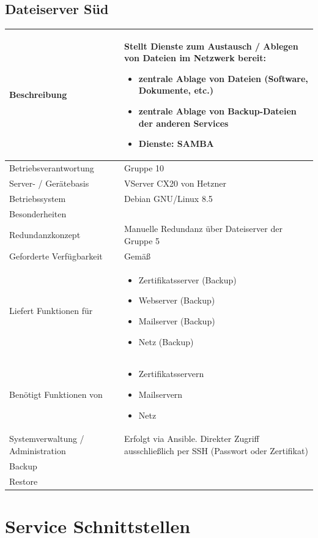 \documentclass[]{article}
\begin{document}
\newpage

\subsection{Dateiserver Süd}\label{dateiserver-suxfcd}

\begin{longtable}{l|p{8cm}}
\toprule
Beschreibung & Stellt Dienste zum Austausch / Ablegen von Dateien im
Netzwerk bereit:

\begin{itemize}
\item
  zentrale Ablage von Dateien (Software, Dokumente, etc.)
\item
  zentrale Ablage von Backup-Dateien der anderen Services
\item
  Dienste: SAMBA
\end{itemize}\tabularnewline
\midrule
Betriebsverantwortung & Gruppe 10\tabularnewline
Server- / Gerätebasis & VServer CX20 von Hetzner\tabularnewline
Betriebssystem & Debian GNU/Linux 8.5\tabularnewline
Besonderheiten &\tabularnewline
Redundanzkonzept & Manuelle Redundanz über Dateiserver der Gruppe
5\tabularnewline
Geforderte Verfügbarkeit & Gemäß\tabularnewline
Liefert Funktionen für & \begin{itemize}
\item
  Zertifikatsserver (Backup)
\item
  Webserver (Backup)
\item
  Mailserver (Backup)
\item
  Netz (Backup)
\end{itemize}\tabularnewline
Benötigt Funktionen von & \begin{itemize}
\item
  Zertifikatsservern
\item
  Mailservern
\item
  Netz
\end{itemize}\tabularnewline
Systemverwaltung / Administration & Erfolgt via Ansible. Direkter Zugriff ausschließlich per SSH (Passwort oder Zertifikat)\tabularnewline
Backup &\tabularnewline
Restore &\tabularnewline
\bottomrule
\end{longtable}

\newpage

\section{Service Schnittstellen}\label{service-schnittstellen}
\end{document}
